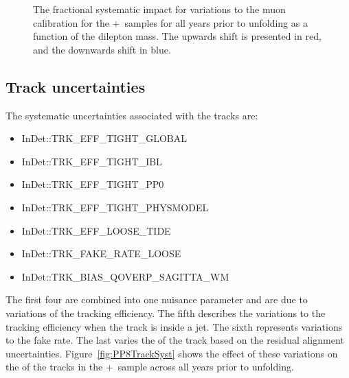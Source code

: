 \begin{figure}[h!]
  \caption{The fractional systematic impact for variations to the muon calibration for the \powheg+\pythia~samples for all years prior to unfolding as a function of the dilepton mass. The upwards shift is presented in red, and the downwards shift in blue.}
  \label{fig:PP8MuCalSystmll}
\end{figure}

\subsection{Track uncertainties}
\label{subsec:Tracksysts}

The systematic uncertainties associated with the tracks are:

\begin{itemize}
  \setlength{\itemsep}{1pt}\setlength{\parskip}{0pt}\setlength{\parsep}{0pt}
  \item InDet::TRK\_EFF\_TIGHT\_GLOBAL
  \item InDet::TRK\_EFF\_TIGHT\_IBL
  \item InDet::TRK\_EFF\_TIGHT\_PP0
  \item InDet::TRK\_EFF\_TIGHT\_PHYSMODEL
  \item InDet::TRK\_EFF\_LOOSE\_TIDE
  \item InDet::TRK\_FAKE\_RATE\_LOOSE
  \item InDet::TRK\_BIAS\_QOVERP\_SAGITTA\_WM
\end{itemize}

The first four are combined into one nuisance parameter and are due to variations of the tracking efficiency. The fifth describes the variations to the tracking efficiency when the track is inside a jet.
The sixth represents variations to the fake rate. The last varies the \pt of the track based on the residual alignment uncertainties. Figure~\ref{fig:PP8TrackSyst} shows the effect of these variations on the \pt of the tracks in the \powheg+\pythia~sample across all years prior to unfolding.

